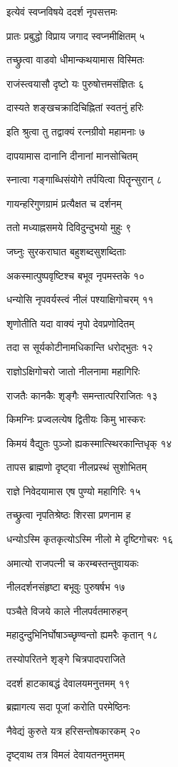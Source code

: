 इत्येवं स्वप्नविषये ददर्श नृपसत्तमः

प्रातः प्रबुद्धो विप्राय जगाद स्वप्नमीक्षितम् ५

तच्छ्रुत्वा वाडवो धीमान्कथयामास विस्मितः

राजंस्त्वयासौ दृष्टो यः पुरुषोत्तमसंज्ञितः ६

दास्यते शङ्खचक्रादिचिह्नितां स्वतनुं हरिः

इति श्रुत्वा तु तद्वाक्यं रत्नग्रीवो महामनाः ७

दापयामास दानानि दीनानां मानसोचितम्

स्नात्वा गङ्गाब्धिसंयोगे तर्पयित्वा पितॄन्सुरान् ८

गायन्हरिगुणग्रामं प्रत्यैक्षत च दर्शनम्

ततो मध्याह्नसमये दिविदुन्दुभयो मुहुः ९

जघ्नुः सुरकराघात बहुशब्दसुशब्दिताः

अकस्मात्पुष्पवृष्टिश्च बभूव नृपमस्तके १०

धन्योसि नृपवर्यस्त्वं नीलं पश्याक्षिगोचरम् ११

शृणोतीति यदा वाक्यं नृपो देवप्रणोदितम्

तदा स सूर्यकोटीनामधिकान्ति धरोद्भुतः १२

राज्ञोऽक्षिगोचरो जातो नीलनामा महागिरिः

राजतैः कानकैः शृङ्गैः समन्तात्परिराजितः १३

किमग्निः प्रज्वलत्येष द्वितीयः किमु भास्करः

किमयं वैद्युतः पुञ्जो ह्यकस्मात्स्थिरकान्तिधृक् १४

तापस ब्राह्मणो दृष्ट्वा नीलप्रस्थं सुशोभितम्

राज्ञे निवेदयामास एष पुण्यो महागिरिः १५

तच्छ्रुत्वा नृपतिश्रेष्ठः शिरसा प्रणनाम ह

धन्योऽस्मि कृतकृत्योऽस्मि नीलो मे दृष्टिगोचरः १६

अमात्यो राजपत्नी च करम्बस्तन्तुवायकः

नीलदर्शनसंहृष्टा बभूवुः पुरुषर्षभ १७

पञ्चैते विजये काले नीलपर्वतमारुहन्

महादुन्दुभिनिर्घोषाञ्च्छृण्वन्तो ह्यमरैः कृतान् १८

तस्योपरितने शृङ्गे चित्रपादपराजिते

ददर्श हाटकाबद्धं देवालयमनुत्तमम् १९

ब्रह्मागत्य सदा पूजां करोति परमेष्ठिनः

नैवेद्यं कुरुते यत्र हरिसन्तोषकारकम् २०

दृष्ट्वाथ तत्र विमलं देवायतनमुत्तमम्

